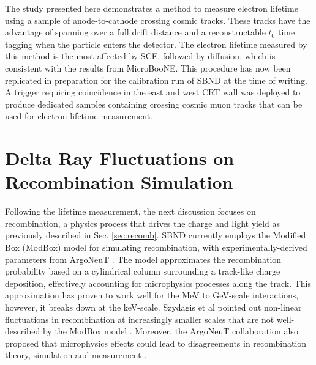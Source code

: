 The study presented here demonstrates a method to measure electron lifetime using a sample of anode-to-cathode crossing cosmic tracks.
These tracks have the advantage of spanning over a full drift distance and a reconstructable $t_{0}$ time tagging when the particle enters the detector.
The electron lifetime measured by this method is the most affected by SCE, followed by diffusion, which is consistent with the results from MicroBooNE.
This procedure has now been replicated in preparation for the calibration run of SBND at the time of writing.
A trigger requiring coincidence in the east and west CRT wall was deployed to produce dedicated samples containing crossing cosmic muon tracks that can be used for electron lifetime measurement.


\section{Delta Ray Fluctuations on Recombination Simulation}
\label{sec7:delta}


Following the lifetime measurement, the next discussion focuses on recombination, a physics process that drives the charge and light yield as previously described in Sec. \ref{sec:recomb}.
SBND currently employs the Modified Box (ModBox) model for simulating recombination, with experimentally-derived parameters from ArgoNeuT \cite{argoneut_recomb}.
The model approximates the recombination probability based on a cylindrical column surrounding a track-like charge deposition, effectively accounting for microphysics processes along the track.
This approximation has proven to work well for the MeV to GeV-scale interactions, however, it breaks down at the keV-scale.
Szydagis et al pointed out non-linear fluctuations in recombination at increasingly smaller scales that are not well-described by the ModBox model \cite{NEST}.   
Moreover, the ArgoNeuT collaboration also proposed that microphysics effects could lead to disagreements in recombination theory, simulation and measurement \cite{argoneut_recomb}.

